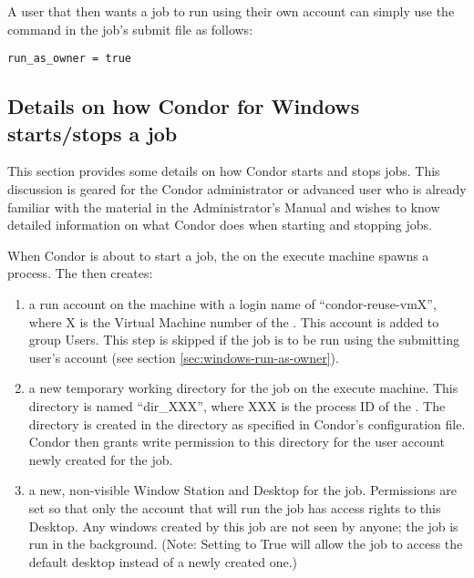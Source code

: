 A user that then wants a job to run using their own account can simply
use the  command in the job's submit file as
follows:
\begin{verbatim}
run_as_owner = true
\end{verbatim}

\subsection{Details on how Condor for Windows starts/stops a job}

This section provides some details on how Condor starts and stops jobs.
This discussion is geared for the Condor administrator or advanced user who is
already familiar with the material in the Administrator's Manual
and wishes to know detailed information on what Condor does when
starting and stopping jobs.

When Condor is about to start a job, the  on the execute
machine spawns a  process.  The  then
creates:
\begin{enumerate}

\item a run account on the machine with a login name of
``condor-reuse-vmX'', where X is the Virtual Machine number of the
.  This account is added to group Users.  This step is
skipped if the job is to be run using the submitting user's account
(see section \ref{sec:windows-run-as-owner}).

\item a new temporary working directory for the job on the execute machine.
This directory is
named ``dir\_XXX'', where XXX is the process ID of the .
The directory is created in the  directory as
specified in Condor's configuration file.  Condor then grants write
permission to this directory for the user account newly created for the
job.

\item a new, non-visible Window Station and Desktop for the job.
Permissions are set so that only the account that will run the job has
access rights to this Desktop.  Any windows created by this job are
not seen by anyone; the job is run in the background.  (Note: Setting
 to True will allow the job to access the
default desktop instead of a newly created one.)

\end{enumerate}

